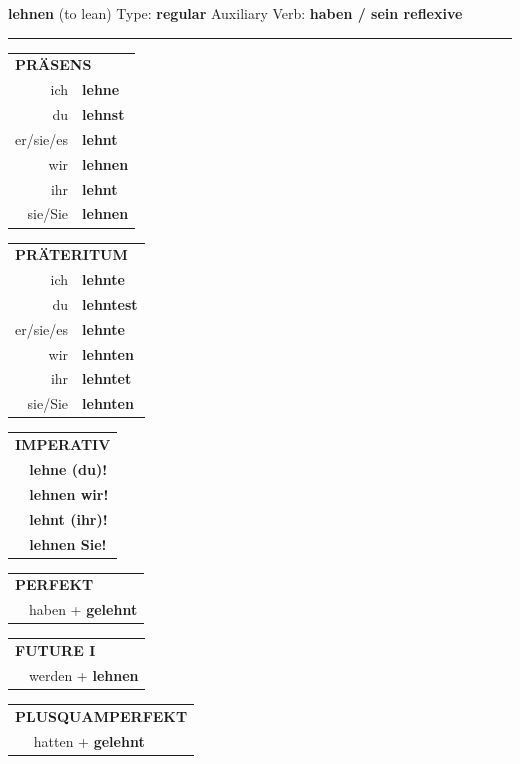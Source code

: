 \documentclass[10pt,a4paper]{revtex4-2}
\begin{document}
\begin{verbbox}
{\Large \bf lehnen} (to lean) \hfill Type: \textbf{regular} \hfill Auxiliary Verb: \textbf{haben / sein reflexive}

\vspace{5pt}
\hrule
\vspace{5pt}

\begin{tabular}{rl}
\multicolumn{2}{l}{\textbf{PRÄSENS}}\\
ich & \textbf{lehne}\\
du & \textbf{lehnst}\\
er/sie/es & \textbf{lehnt}\\
wir & \textbf{lehnen}\\
ihr & \textbf{lehnt}\\
sie/Sie & \textbf{lehnen}\\
\end{tabular}
\hfill
\begin{tabular}{rl}
\multicolumn{2}{l}{\textbf{PRÄTERITUM}}\\
ich & \textbf{lehnte}\\
du & \textbf{lehntest}\\
er/sie/es & \textbf{lehnte}\\
wir & \textbf{lehnten}\\
ihr & \textbf{lehntet}\\
sie/Sie & \textbf{lehnten}\\
\end{tabular}
\hfill
\begin{tabular}{rl}
\multicolumn{2}{l}{\textbf{IMPERATIV}}\\
& \textbf{lehne (du)!}\\
& \textbf{lehnen wir!}\\
& \textbf{lehnt (ihr)!}\\
& \textbf{lehnen Sie!}\\
\end{tabular}

\vspace{10pt}

\begin{tabular}{rl}
\multicolumn{2}{l}{\textbf{PERFEKT}}\\
& haben + \textbf{gelehnt}\\
\end{tabular}
\hfill
\begin{tabular}{rl}
\multicolumn{2}{l}{\textbf{FUTURE I}}\\
& werden + \textbf{lehnen}\\
\end{tabular}
\hfill
\begin{tabular}{rl}
\multicolumn{2}{l}{\textbf{PLUSQUAMPERFEKT}}\\
& hatten + \textbf{gelehnt}\\
\end{tabular}


\end{verbbox}
\end{document}

